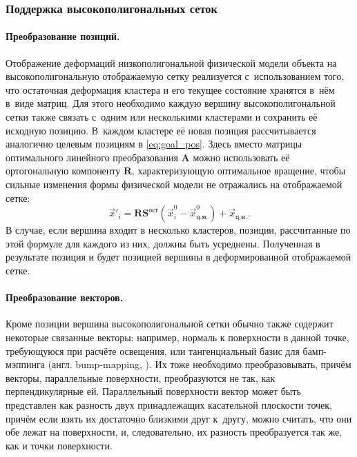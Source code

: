 \documentclass[a4paper, 14pt, titlepage]{extarticle}
\newcommand{\eng}[1]{{\English #1}}
\newcommand{\vect}[1]{\vec{#1}} %
\newcommand{\matx}[1]{\mathbf{#1}} %
\begin{document}
      \subsubsection{Поддержка высокополигональных сеток}\label{sssec:hi-poly}

        \paragraph{Преобразование позиций.}
        Отображение деформаций низкополигональной физической модели объекта на высокополигональную
        отображаемую сетку реализуется с~использованием того, что остаточная деформация кластера и
        его текущее состояние хранятся в~нём в~виде матриц.  Для этого необходимо каждую вершину
        высокополигональной сетки также связать с~одним или несколькими кластерами и сохранить её
        исходную позицию. В~каждом кластере её новая позиция рассчитывается аналогично целевым
        позициям в \eqref{eq:goal_pos}. Здесь вместо матрицы оптимального линейного преобразования
        $\matx A$ можно использовать её ортогональную компоненту $\matx R$, характеризующую
        оптимальное вращение, чтобы сильные изменения формы физической модели не отражались на
        отображаемой сетке:
        \begin{equation}\label{eq:graphical_pos}
          \vect{x}'_i = \matx{R} \matx{S}^{ост} (\vect{x}^0_i - \vect{x}^0_{ц.м.}) + \vect{x}_{ц.м.}.
        \end{equation}
        В случае, если вершина входит в несколько кластеров, позиции, рассчитанные по этой формуле
        для каждого из них, должны быть усреднены. Полученная в результате позиция и будет позицией
        вершины в деформированной отображаемой сетке.

        \paragraph{Преобразование векторов.}
        Кроме позиции вершина высокополигональной сетки обычно также содержит некоторые связанные векторы:
        например, нормаль к поверхности в данной точке, требующуюся при расчёте освещения, или
        тангенциальный базис для бамп-мэппинга (англ. \eng{bump-mapping}, \cite{blinn-bump}). Их тоже необходимо
        преобразовывать, причём векторы, параллельные поверхности, преобразуются не так, как
        перпендикулярные ей. Параллельный поверхности вектор может быть представлен как разность двух
        принадлежащих касательной плоскости точек, причём если взять их достаточно близкими друг
        к~другу, можно считать, что они обе лежат на поверхности, и, следовательно, их разность
        преобразуется так же, как и точки поверхности.
\end{document}
